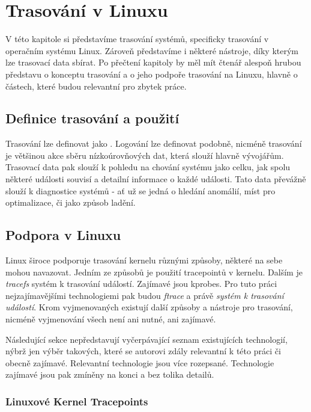 \chapter{Trasování v Linuxu}

V této kapitole si představíme trasování systémů, specificky trasování v operačním systému Linux. Zároveň představíme i některé nástroje, díky kterým lze trasovací data sbírat. Po přečtení kapitoly by měl mít čtenář alespoň hrubou představu o konceptu trasování a o jeho podpoře trasování na Linuxu, hlavně o částech, které budou relevantní pro zbytek práce.

\section{Definice trasování a použití}

Trasování lze definovat jako . Logování lze definovat podobně, nicméně trasování je většinou akce sběru nízkoúrovňových dat, která slouží hlavně vývojářům. Trasovací data pak slouží k pohledu na chování systému jako celku, jak spolu některé události souvisí a detailní informace o každé události. Tato data převážně slouží k diagnostice systémů - ať už se jedná o hledání anomálií, míst pro optimalizace, či jako způsob ladění.

\section{Podpora v Linuxu}

Linux široce podporuje trasování kernelu různými způsoby, některé na sebe mohou navazovat. Jedním ze způsobů je použití tracepointů v kernelu. Dalším je \emph{tracefs} systém k trasování událostí. Zajímavé jsou kprobes. Pro tuto práci nejzajímavějšími technologiemi pak budou \emph{ftrace} a právě \emph{systém k trasování událostí}. Krom vyjmenovaných existují další způsoby a nástroje pro trasování, nicméně vyjmenování všech není ani nutné, ani zajímavé.

Následující sekce nepředstavují vyčerpávající seznam existujících technologií, nýbrž jen výběr takových, které se autorovi zdály relevantní k této práci či obecně zajímavé. Relevantní technologie jsou více rozepsané. Technologie zajímavé jsou pak zmíněny na konci a bez tolika detailů.

\subsection{Linuxové Kernel Tracepoints}
\label{tracepoints}

